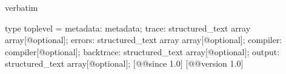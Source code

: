 \begin{camlexample}{verbatim}
\begin{caml}
\begin{camlinput}
type toplevel = {
  metadata: metadata;
  trace: structured_text array array[@optional];
  errors: structured_text array array[@optional];
  compiler: compiler[@optional];
  backtrace: structured_text array[@optional];
  output: structured_text array[@optional];
} [@@since 1.0]
[@@version 1.0]
\end{camlinput}
\end{caml}
\end{camlexample}
